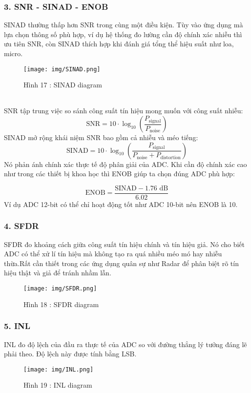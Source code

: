 \documentclass[a4paper,13pt]{article}
\begin{document}
\subsubsection*{3. SNR - SINAD - ENOB} 
SINAD thường thấp hơn SNR trong cùng một điều kiện.
Tùy vào ứng dụng mà lựa chọn thông số phù hợp, ví dụ hệ thống đo lường cần độ chính xác nhiễu thì ưu tiên SNR, còn SINAD thích hợp khi đánh giá tổng thể hiệu suất như loa, micro.
\begin{figure}[htbp]
    \centering
    \texttt{[image: img/SINAD.png]}
    \caption*{Hình 17 : SINAD diagram \cite{key3} }
    \label{fig:model}
\end{figure}\\
SNR tập trung việc so sánh công suất tín hiệu mong muốn với công suất nhiễu:
\begin{equation}
    \text{SNR} = 10 \cdot \log_{10} \left(\frac{P_{\text{signal}}}{P_{\text{noise}}}\right) \tag{14}
\end{equation}
SINAD mở rộng khái niệm SNR bao gồm cả nhiễu và méo tiếng:
\begin{equation}
    \text{SINAD} = 10 \cdot \log_{10} \left(\frac{P_{\text{signal}}}{P_{\text{noise}} + P_{\text{distortion}}}\right) \tag{15}
\end{equation}
Nó phản ánh chính xác thực tế độ phân giải của ADC. Khi cần độ chính xác cao như trong các thiết bị khoa học thì ENOB giúp ta chọn đúng ADC phù hợp:

\begin{equation}
    \text{ENOB} = \frac{\text{SINAD} - 1.76 \text{ dB}}{6.02} \tag{6}
\end{equation}
Ví dụ ADC 12-bit có thể chỉ hoạt động tốt như ADC 10-bit nên ENOB là 10.
\clearpage
\subsubsection*{4. SFDR}
SFDR đo khoảng cách giữa công suất tín hiệu chính và tín hiệu giả. Nó cho biết ADC có thể xử lí tín hiệu mà không tạo ra quá nhiều méo mó hay nhiễu thừa.Rất cần thiết trong các ứng dụng quân sự như Radar để phân biệt rõ tín hiệu thật và giả để tránh nhầm lẫn.
\begin{figure}[htbp]
    \centering
    \texttt{[image: img/SFDR.png]}
    \caption*{Hình 18 : SFDR diagram \cite{key3} }
    \label{fig:model}
\end{figure}
\subsubsection*{5. INL}INL đo độ lệch của đầu ra thực tế của ADC so với đường thẳng lý tưởng đáng lẽ phải theo. Độ lệch này được tính bằng LSB.
\begin{figure}[htbp]
    \centering
    \texttt{[image: img/INL.png]}
    \caption*{Hình 19 : INL diagram \cite{key3} }
    \label{fig:model}
\end{figure}
\end{document}
